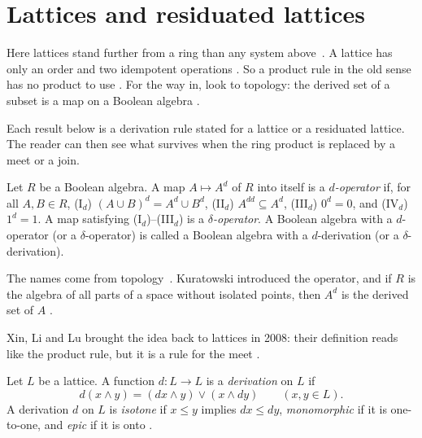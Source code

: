 \section{Lattices and residuated lattices}\label{sec:other-systems:lattices}

Here lattices stand further from a ring than any system above~\cite[p.~365]{Goldberg1975}.
A lattice has only an order and two idempotent operations
\cite[p.~309]{XinLiLu2008}.
So a product rule in the old sense has no product to use
\cite[p.~309]{XinLiLu2008}.
For the way in, look to topology:
the
derived set of a subset is a map on a Boolean algebra
\cite[p.~365]{Goldberg1975}.

Each result below is a derivation rule stated for a lattice or a residuated
lattice. The reader can then see what survives when the ring product is
replaced by a meet or a join. %

\begin{definition}\label{def:other:goldberg-derivation}
Let $R$ be a Boolean algebra. A map $A \mapsto A^{d}$ of $R$ into itself
is a \emph{$d$-operator} if, for all $A, B \in R$,
\textup{(I$_d$)} $(A \cup B)^{d} = A^{d} \cup B^{d}$,
\textup{(II$_d$)} $A^{dd} \subseteq A^{d}$,
\textup{(III$_d$)} $0^{d} = 0$, and
\textup{(IV$_d$)} $1^{d} = 1$.
A map satisfying \textup{(I$_d$)}--\textup{(III$_d$)} is a
\emph{$\delta$-operator}. A Boolean algebra with a $d$-operator (or a
$\delta$-operator) is called a Boolean algebra with a $d$-derivation (or a
$\delta$-derivation).
\end{definition}

The names come from topology~\cite[p.~365]{Goldberg1975}. Kuratowski introduced the operator, and if
$R$ is the algebra of all parts of a space without isolated
points, then $A^{d}$ is the derived set of $A$
\cite[p.~365]{Goldberg1975}.

Xin, Li and Lu brought the idea back to lattices in 2008: their
definition reads like the product rule, but it is a rule for the meet
\cite[Definition~3.1, p.~309]{XinLiLu2008}.

\begin{definition}\label{def:other:lattice-derivation}
Let $L$ be a lattice. A function $d \colon L \to L$ is a \emph{derivation}
on $L$ if
\[
d(x \wedge y) = (dx \wedge y) \vee (x \wedge dy)
\qquad (x, y \in L).
\]
A derivation $d$ on $L$ is \emph{isotone} if $x \le y$ implies $dx \le dy$,
\emph{monomorphic} if it is one-to-one, and \emph{epic} if it is onto
\cite[Definition~3.7, p.~310]{XinLiLu2008}.
\end{definition}

